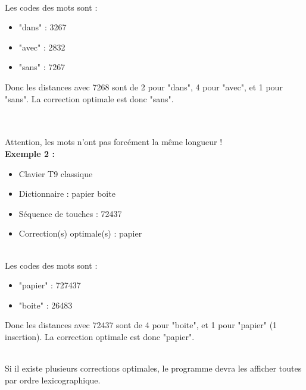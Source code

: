 \documentclass[10pt]{article}
\begin{document}
~\\
\noindent
Les codes des mots sont :
\begin{itemize}
\item "dans" : 3267
\item "avec" : 2832
\item "sans" : 7267
\end{itemize}
Donc les distances avec 7268 sont de 2 pour "dans", 4 pour "avec", et 1 pour "sans".
La correction optimale est donc "sans".

~\\
~\\
\noindent
Attention, les mots n'ont pas forcément la même longueur !
~\\
\noindent
\textbf{Exemple 2 :}
\begin{itemize}
\item Clavier T9 classique
\item Dictionnaire : papier boite
\item Séquence de touches : 72437
\item Correction(s) optimale(s) : papier
\end{itemize}

~\\
\noindent
Les codes des mots sont :
\begin{itemize}
\item "papier" : 727437
\item "boite" : 26483
\end{itemize}
Donc les distances avec 72437 sont de 4 pour "boite", et 1 pour "papier" (1 insertion).
La correction optimale est donc "papier".

~\\
Si il existe plusieurs corrections optimales, le programme devra les afficher toutes par ordre lexicographique.
\end{document}
